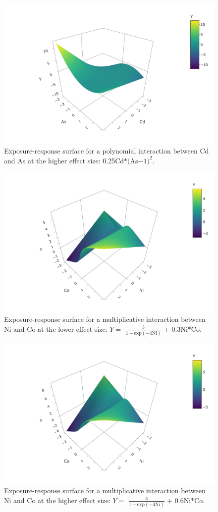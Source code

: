 \documentclass[12pt, twoside]{amherstthesis}
\begin{document}
\begin{figure}

{\centering \includegraphics[width=0.5\linewidth]{figures/surfaces/bp2} 

}

\caption{Exposure-response surface for a polynomial interaction between Cd and As at the higher effect size: 0.25Cd$*($As$-1)^2$.}\label{fig:bp2}
\end{figure}
\begin{figure}

{\centering \includegraphics[width=0.5\linewidth]{figures/surfaces/cm1} 

}

\caption{Exposure-response surface for a multiplicative interaction between Ni and Co at the lower effect size: $Y=$ $\frac{3}{1+\textrm{exp}(-4\textrm{Ni})}$ + 0.3Ni$*$Co.}\label{fig:cm1}
\end{figure}
\begin{figure}

{\centering \includegraphics[width=0.5\linewidth]{figures/surfaces/cm2} 

}

\caption{Exposure-response surface for a multiplicative interaction between Ni and Co at the higher effect size: $Y=$ $\frac{3}{1+\textrm{exp}(-4\textrm{Ni})}$ + 0.6Ni$*$Co.}\label{fig:cm2}
\end{figure}
\end{document}

